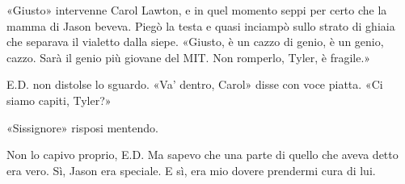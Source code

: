 «Giusto» intervenne Carol Lawton, e in quel momento seppi per certo che
la mamma di Jason beveva. Piegò la testa e quasi inciampò sullo strato
di ghiaia che separava il vialetto dalla siepe. «Giusto, è un cazzo di
genio, è un genio, cazzo. Sarà il genio più giovane del MIT. Non
romperlo, Tyler, è fragile.»

E.D. non distolse lo sguardo. «Va' dentro, Carol» disse con voce piatta.
«Ci siamo capiti, Tyler?»

«Sissignore» risposi mentendo.

Non lo capivo proprio, E.D. Ma sapevo che una parte di quello che aveva
detto era vero. Sì, Jason era speciale. E sì, era mio dovere prendermi
cura di lui.